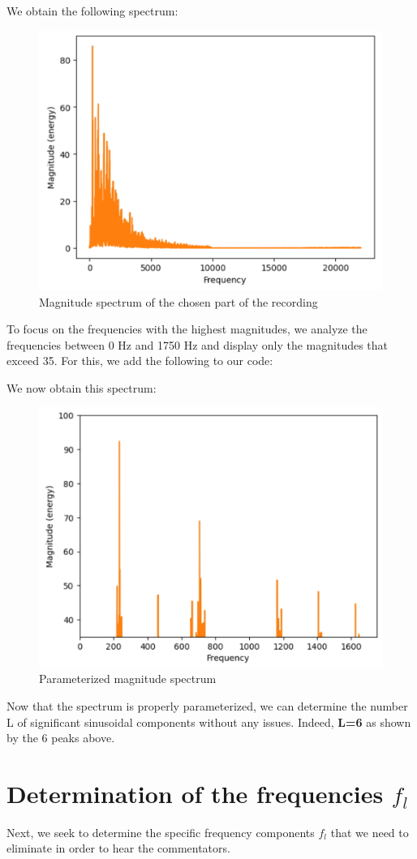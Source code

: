 We obtain the following spectrum:
\begin{figure}[H]
  \centering
  \includegraphics[width=0.7\linewidth]{img/Figure1.jpg}
  \caption{Magnitude spectrum of the chosen part of the recording}
\end{figure}

\newpage
To focus on the frequencies with the highest magnitudes, we analyze the frequencies between 0 Hz and 1750 Hz and display only the magnitudes that exceed 35. For this, we add the following to our code:



We now obtain this spectrum:
\begin{figure}[H]
  \centering
  \includegraphics[width=0.7\linewidth]{img/Figure2.jpg}
  \caption{Parameterized magnitude spectrum}
\end{figure}

Now that the spectrum is properly parameterized, we can determine the number L of significant sinusoidal components without any issues. Indeed, \textbf{L=6} as shown by the 6 peaks above.

\newpage
\section{Determination of the frequencies $f_l$}
Next, we seek to determine the specific frequency components $f_l$ that we need to eliminate in order to hear the commentators.


